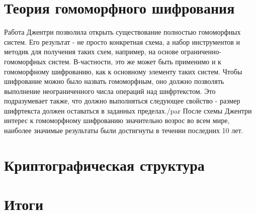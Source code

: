   \section{Теория гомоморфного шифрования} \label{sec:ch1/sec2}
   Работа Джентри позволила открыть существование полностью гомоморфных систем. Его результат - не просто конкретная схема, а набор инструментов и методик для получения таких схем, например, на основе ограниченно-гомоморфных систем. В-частности, это же может быть применимо и к гомоморфному шифрованию, как к основному элементу таких систем. Чтобы шифрование можно было назвать гомоморфным, оно должно позволять выполнение неограниченного числа операций над шифртекстом. Это подразумевает также, что должно выполняться следующее свойство - размер шифртекста должен оставаться в заданных пределах./par
   После схемы Джентри интерес к гомоморфному шифрованию значительно возрос во всем мире, наиболее значимые результаты были достигнуты в течении последних 10 лет.

   

  \section{Криптографическая структура} \label{sec:ch1/sec3}
  
   

  \section{Итоги} \label{sec:ch1/sec4}
   
   

